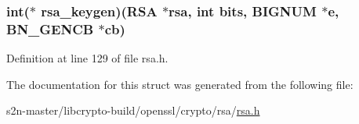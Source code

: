 \subsubsection[{\texorpdfstring{rsa\+\_\+keygen}{rsa_keygen}}]{\setlength{\rightskip}{0pt plus 5cm}int($\ast$ rsa\+\_\+keygen)({\bf R\+SA} $\ast$rsa, int {\bf bits}, {\bf B\+I\+G\+N\+UM} $\ast${\bf e}, {\bf B\+N\+\_\+\+G\+E\+N\+CB} $\ast${\bf cb})}\hypertarget{structrsa__meth__st_a8aed2bc7ebc70dd006a4657ac8075e27}{}\label{structrsa__meth__st_a8aed2bc7ebc70dd006a4657ac8075e27}


Definition at line 129 of file rsa.\+h.



The documentation for this struct was generated from the following file\+:\begin{DoxyCompactItemize}
\item 
s2n-\/master/libcrypto-\/build/openssl/crypto/rsa/\hyperlink{crypto_2rsa_2rsa_8h}{rsa.\+h}\end{DoxyCompactItemize}
